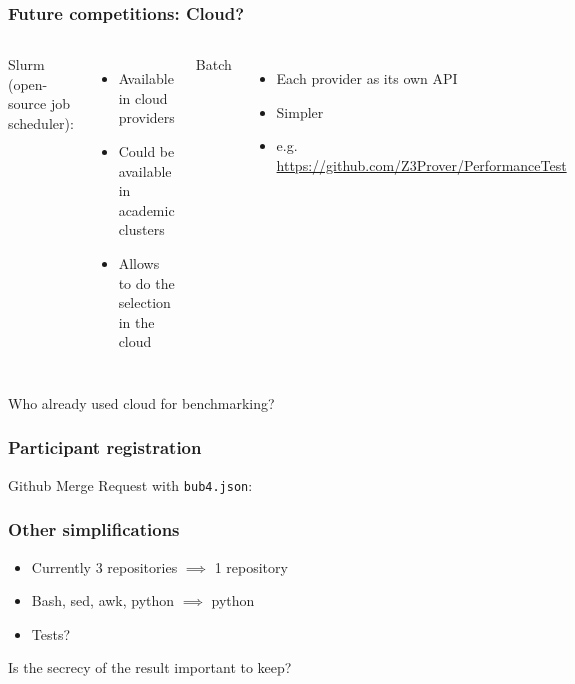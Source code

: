 \documentclass[table]{beamer}
\begin{document}







\begin{frame}
    \frametitle{Future competitions: Cloud? \logocloud}
\begin{columns}
    Slurm (open-source job scheduler):
    \begin{itemize}
        \item Available in cloud providers
        \item Could be available in academic clusters
        \item Allows to do the selection in the cloud
    \end{itemize}
    Batch
    \begin{itemize}
        \item Each provider as its own API
        \item Simpler
        \item e.g. \url{https://github.com/Z3Prover/PerformanceTest}
    \end{itemize}
\end{columns}
    \pause
    \vfill
    \begin{center}
        \large
        Who already used cloud for benchmarking?
    \end{center}
\end{frame}



\begin{frame}
    \frametitle{Participant registration}
    Github Merge Request with \lstinline{bub4.json}:

    
\end{frame}


\begin{frame}
    \frametitle{Other simplifications}
    \begin{itemize}
        \item Currently 3 repositories $\implies$ 1 repository
        \item Bash, sed, awk, python $\implies$ python
        \item Tests?
    \end{itemize}
\pause
\vfill
    \begin{center}
        {\large Is the secrecy of the result important to keep?}
    \end{center}
\end{frame}
\end{document}
